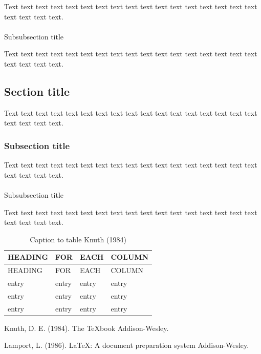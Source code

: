 \documentclass[
]{iucrjournals}
\makeatletter
\let\oldparagraph\paragraph
\renewcommand{\paragraph}{
    \@ifstar
      \xxxParagraphStar
      \xxxParagraphNoStar
  }
\newcommand{\xxxParagraphStar}[1]{\oldparagraph*{#1}\mbox{}}
\newcommand{\xxxParagraphNoStar}[1]{\oldparagraph{#1}\mbox{}}
\newlength{\cslhangindent}
\newenvironment{CSLReferences}[2] %
 {\begin{list}{}{%
  \setlength{\itemindent}{0pt}
  \setlength{\leftmargin}{0pt}
  \setlength{\parsep}{0pt}
  \ifodd #1
   \setlength{\leftmargin}{\cslhangindent}
   \setlength{\itemindent}{-1\cslhangindent}
  \fi
  \setlength{\itemsep}{#2\baselineskip}}}
 {\end{list}}
\makeatother
\begin{document}
Text text text text text text text text text text text text text text
text text text text text text text.

\paragraph{Subsubsection title}\label{subsubsection-title}

Text text text text text text text text text text text text text text
text text text text text text text.

\subsection{Section title}\label{section-title-1}

Text text text text text text text text text text text text text text
text text text text text text text.

\subsubsection{Subsection title}\label{subsection-title-1}

Text text text text text text text text text text text text text text
text text text text text text text.

\paragraph{Subsubsection title}\label{subsubsection-title-1}

Text text text text text text text text text text text text text text
text text text text text text text.

\begin{longtable}[]{@{}llll@{}}
\caption{Caption to table Knuth (1984)}\tabularnewline
\toprule\noalign{}
HEADING & FOR & EACH & COLUMN \\
\midrule\noalign{}
\endfirsthead
\toprule\noalign{}
HEADING & FOR & EACH & COLUMN \\
\midrule\noalign{}
\endhead
\bottomrule\noalign{}
\endlastfoot
entry & entry & entry & entry \\
entry & entry & entry & entry \\
entry & entry & entry & entry \\
\end{longtable}

\label{refs}
\begin{CSLReferences}{1}{1}
Knuth, D. E. (1984). The TeXbook Addison-Wesley.

Lamport, L. (1986). {LaTeX}: A document preparation system
Addison-Wesley.

\end{CSLReferences}
\end{document}
